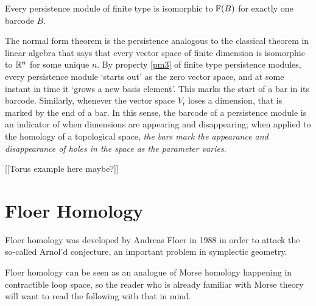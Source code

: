 \begin{theorem}
Every persistence module of finite type is isomorphic to $\mathbb{F}(B)$ for exactly one barcode $B$.
\end{theorem}

The normal form theorem is the persistence analogous to the classical theorem in linear algebra that says that every vector space of finite dimension is isomorphic to $\mathbb{R}^n$ for some unique $n$. By property \ref{pm3} of finite type persistence modules, every persistence module `starts out' as the zero vector space, and at some instant in time it `grows a new basis element'. This marks the start of a bar in its barcode. Similarly, whenever the vector space $V_t$ loses a dimension, that is marked by the end of a bar. In this sense, the barcode of a persistence module is an indicator of when dimensions are appearing and disappearing; when applied to the homology of a topological space, \emph{the bars mark the appearance and disappearance of holes in the space as the parameter varies}.

[[Torus example here maybe?]]


\section{Floer Homology}
\label{sec:ph}

Floer homology was developed by Andreas Floer in 1988 in order to attack the so-called Arnol'd conjecture, an important problem in symplectic geometry.

Floer homology can be seen as an analogue of Morse homology happening in contractible loop space, so the reader who is already familiar with Morse theory will want to read the following with that in mind.


